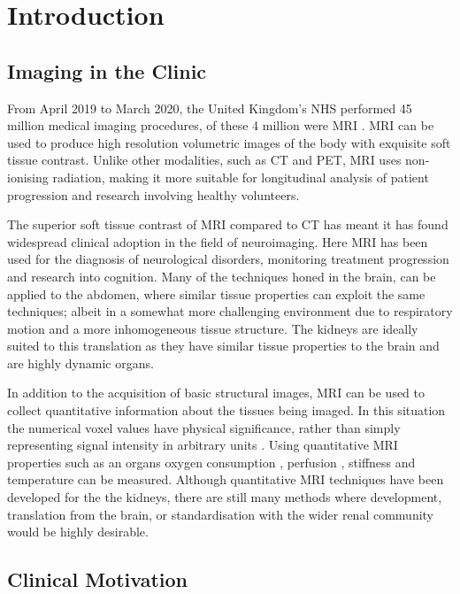 \chapter{Introduction}
\label{chap:intro}
\section{Imaging in the Clinic}
\label{sec:intro_imaging}
From April 2019 to March 2020, the United Kingdom's \ac{NHS} performed 45 million medical imaging procedures, of these 4 million were \ac{MRI} \cite{noauthor_diagnostic_2020}. \ac{MRI} can be used to produce high resolution volumetric images of the body with exquisite soft tissue contrast. Unlike other modalities, such as \ac{CT} and \ac{PET}, \ac{MRI} uses non-ionising radiation, making it more suitable for longitudinal analysis of patient progression and research involving healthy volunteers.

The superior soft tissue contrast of \ac{MRI} compared to \ac{CT} has meant it has found widespread clinical adoption in the field of neuroimaging. Here \ac{MRI} has been used for the diagnosis of neurological disorders, monitoring treatment progression and research into cognition. Many of the techniques honed in the brain, can be applied to the abdomen, where similar tissue properties can exploit the same techniques; albeit in a somewhat more challenging environment due to respiratory motion and a more inhomogeneous tissue structure. The kidneys are ideally suited to this translation as they have similar tissue properties to the brain and are highly dynamic organs.

In addition to the acquisition of basic structural images, \ac{MRI} can be used to collect quantitative information about the tissues being imaged. In this situation the numerical voxel values have physical significance, rather than simply representing signal intensity in arbitrary units \cite{tofts_quantitative_2003}. Using quantitative \ac{MRI} properties such as an organs oxygen consumption \cite{zhang_quantitative_2015}, perfusion \cite{karger_quantitation_2000}, stiffness \cite{mariappan_magnetic_2010} and temperature \cite{yuan_towards_2012} can be measured. Although quantitative \ac{MRI} techniques have been developed for the the kidneys, there are still many methods where development, translation from the brain, or standardisation with the wider renal community would be highly desirable.

\section{Clinical Motivation}
\label{sec:intro_clinical}

